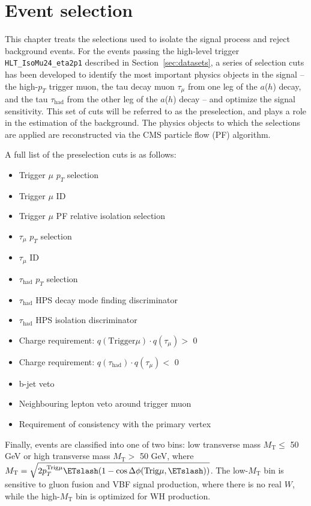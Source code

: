 \chapter{Event selection\label{sec:evtsel}}

This chapter treats the selections used to isolate the signal process and reject background events. For the events passing the high-level trigger \texttt{HLT\_IsoMu24\_eta2p1} described in Section~\ref{sec:datasets}, a series of selection cuts has been developed to identify the most important physics objects in the signal -- the high-$p_T$ trigger muon, the tau decay muon $\tau_{\mu}$ from one leg of the $a$($h$) decay, and the tau $\tau_{\text{had}}$ from the other leg of the $a$($h$) decay -- and optimize the signal sensitivity. This set of cuts will be referred to as the preselection, and plays a role in the estimation of the background. The physics objects to which the selections are applied are reconstructed via the CMS particle flow (PF) algorithm.

A full list of the preselection cuts is as follows:

\begin{itemize}
	\item Trigger $\mu$ $p_T$ selection
	\item Trigger $\mu$ ID
	\item Trigger $\mu$ PF relative isolation selection
	\item $\tau_{\mu}$ $p_T$ selection
	\item $\tau_{\mu}$ ID
	\item $\tau_{\text{had}}$ $p_T$ selection
	\item $\tau_{\text{had}}$ HPS decay mode finding discriminator
	\item $\tau_{\text{had}}$ HPS isolation discriminator
	\item Charge requirement: $q(\text{Trigger} \mu) \cdot q(\tau_{\mu}) >$ 0
	\item Charge requirement: $q(\tau_{\text{had}}) \cdot q(\tau_{\mu}) <$ 0
        \item b-jet veto
        \item Neighbouring lepton veto around trigger muon
	\item Requirement of consistency with the primary vertex
\end{itemize}

Finally, events are classified into one of two bins: low transverse mass $M_{\text{T}} \le$ 50 GeV or high transverse mass $M_{\text{T}} >$ 50 GeV, where $M_{\text{T}} = \sqrt{2p_{T}^{\text{Trig}\mu}\ETslash(1 - \cos{\Delta\phi(\text{Trig}\mu, \ETslash)})}$.  The low-$M_{\text{T}}$ bin is sensitive to gluon fusion and VBF signal production, where there is no real $W$, while the high-$M_{\text{T}}$ bin is optimized for WH production.

